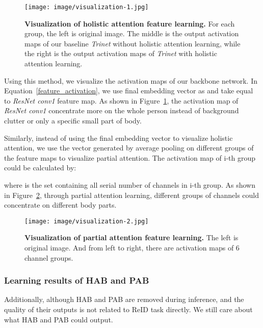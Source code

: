 \documentclass[10pt,twocolumn,letterpaper]{article}
\begin{document}
\begin{figure}[h]		 \begin{center}
		\begin{minipage}{0.9\linewidth}
			\texttt{[image: image/visualization-1.jpg]}
		\end{minipage}


	\end{center}
	\caption{\textbf{Visualization of holistic attention feature learning.} For each group, the left is original image. The middle is the output activation maps of our baseline \textit{Trinet}\cite{hermans2017defense} without holistic attention learning, while the right is the output activation maps of \textit{Trinet}\cite{hermans2017defense} with holistic attention learning. }
	\label{fig:sp1}
\end{figure}

Using this method, we visualize the activation maps of our backbone network. In Equation~\ref{feature_activation}, we use final embedding vector as  and take  equal to \textit{ResNet conv1} feature map. As shown in Figure~\ref{fig:sp1}, the activation map of \textit{ResNet conv1} concentrate more on the whole person instead of background clutter or only a specific small part of body.

Similarly, instead of using the final embedding vector to visualize holistic attention, we use the vector generated by average pooling on different groups of the feature maps to visualize partial attention. The activation map of i-th group could be calculated by:

where  is the set containing all serial number of channels in i-th group. As shown in Figure~\ref{fig:sp2}, through partial attention learning, different groups of channels could concentrate on different body parts.

\begin{figure}[h]		 \begin{center}
		\begin{minipage}{0.9\linewidth}
			\texttt{[image: image/visualization-2.jpg]}
		\end{minipage}


	\end{center}
	\caption{\textbf{Visualization of partial attention feature learning.} The left is original image. And from left to right, there are activation maps of 6 channel groups.}
	\label{fig:sp2}
\end{figure}

\subsubsection{Learning results of HAB and PAB}
Additionally, although HAB and PAB are removed during inference, and the quality of their outputs is not related to ReID task directly. We still care about what HAB and PAB could output.
\end{document}
